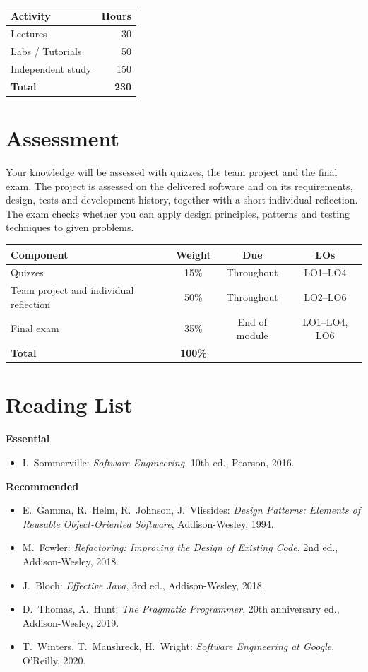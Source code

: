 \documentclass[11pt,a4paper]{article}
\begin{document}
\begin{tabularx}{0.6\textwidth}{X r}
\toprule
\textbf{Activity} & \textbf{Hours} \\
\midrule
Lectures            & 30 \\
Labs / Tutorials    & 50 \\
Independent study   & 150 \\
\midrule
\textbf{Total}      & \textbf{230} \\
\bottomrule
\end{tabularx}

\section{Assessment}
Your knowledge will be assessed with quizzes, the team project and the final exam.
The project is assessed on the delivered software and on its requirements, design,
tests and development history, together with a short individual reflection. The exam
checks whether you can apply design principles, patterns and testing techniques to
given problems.

\begin{tabularx}{\textwidth}{X c c c}
\toprule
\textbf{Component} & \textbf{Weight} & \textbf{Due} & \textbf{LOs} \\
\midrule
Quizzes & 15\% & Throughout & LO1--LO4 \\
Team project and individual reflection & 50\% & Throughout & LO2--LO6 \\
Final exam & 35\% & End of module & LO1--LO4, LO6 \\
\midrule
\textbf{Total} & \textbf{100\%} & & \\
\bottomrule
\end{tabularx}

\section{Reading List}
\textbf{Essential}
\begin{itemize}
  \item I.\ Sommerville: \textit{Software Engineering}, 10th ed., Pearson, 2016.
\end{itemize}
\textbf{Recommended}
\begin{itemize}
  \item E.\ Gamma, R.\ Helm, R.\ Johnson, J.\ Vlissides: \textit{Design Patterns: Elements of Reusable Object-Oriented Software}, Addison-Wesley, 1994.
  \item M.\ Fowler: \textit{Refactoring: Improving the Design of Existing Code}, 2nd ed., Addison-Wesley, 2018.
  \item J.\ Bloch: \textit{Effective Java}, 3rd ed., Addison-Wesley, 2018.
  \item D.\ Thomas, A.\ Hunt: \textit{The Pragmatic Programmer}, 20th anniversary ed., Addison-Wesley, 2019.
  \item T.\ Winters, T.\ Manshreck, H.\ Wright: \textit{Software Engineering at Google}, O'Reilly, 2020.
\end{itemize}
\end{document}
